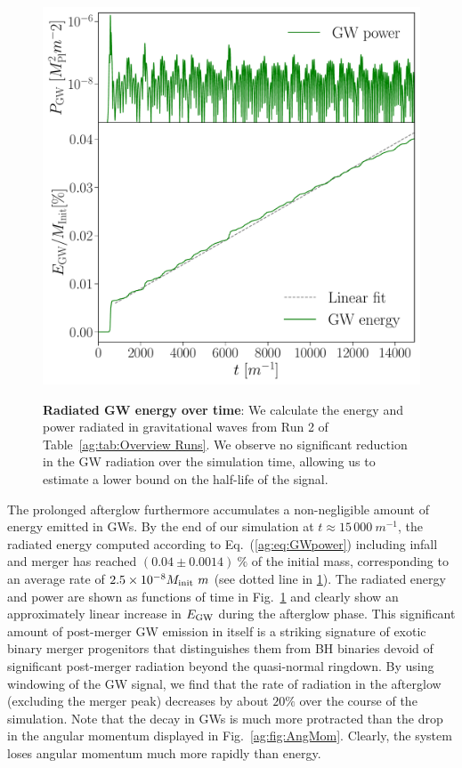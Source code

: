 \begin{figure}[h!]
\begin{center}
{\includegraphics[width=0.6\columnwidth]{ag_fig/Energy_Power.pdf}}
\caption{{\bf Radiated GW energy over time}: We calculate the energy and power radiated in gravitational waves from Run 2 of Table~\ref{ag:tab:Overview Runs}. 
We observe no significant reduction in the GW radiation over the simulation time, allowing us to estimate a lower bound on the half-life of the signal.
    }
\label{ag:fig:EnergyPower}
\end{center}
\end{figure}
 






The prolonged afterglow furthermore accumulates a non-negligible
amount of energy emitted in GWs. By the end of our simulation
at $t\approx 15\,000~m^{-1}$, the radiated energy computed
according to Eq.~(\ref{ag:eq:GWpower}) including
infall and merger has reached
$(0.04 \pm 0.0014)~\% $ of the initial mass,
corresponding to an average rate of $2.5 \times 10^{-8} M_{\rm init}~m$ (see dotted line in \ref{ag:fig:EnergyPower}). 
The radiated energy and power are shown
as functions of time in Fig.~\ref{ag:fig:EnergyPower}
and clearly show an approximately linear increase in
$E_{\rm GW}$ during the afterglow phase. 
This significant amount of post-merger GW emission in itself is a
striking signature of exotic binary merger progenitors
that distinguishes them from BH binaries devoid 
of significant post-merger radiation beyond the quasi-normal ringdown. 
By using windowing of the GW signal, we find that the rate of radiation in the afterglow (excluding the merger peak) decreases by about $20 \%$ over the course of the simulation.
Note that the decay in GWs is much more protracted than the drop in the angular momentum displayed in Fig.~\ref{ag:fig:AngMom}.
Clearly, the system loses angular momentum much more rapidly
than energy.


